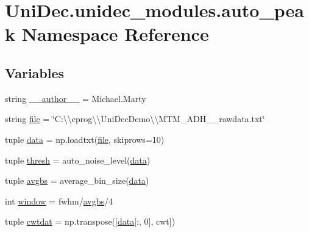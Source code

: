 \hypertarget{namespace_uni_dec_1_1unidec__modules_1_1auto__peak}{}\section{Uni\+Dec.\+unidec\+\_\+modules.\+auto\+\_\+peak Namespace Reference}
\label{namespace_uni_dec_1_1unidec__modules_1_1auto__peak}
\subsection*{Variables}
\begin{DoxyCompactItemize}
\item 
string \hyperlink{namespace_uni_dec_1_1unidec__modules_1_1auto__peak_a4ac9c8672c4aae9cb4a8b70086fb8dbf}{\+\_\+\+\_\+author\+\_\+\+\_\+} = \textquotesingle{}Michael.\+Marty\textquotesingle{}
\item 
string \hyperlink{namespace_uni_dec_1_1unidec__modules_1_1auto__peak_aed4928bf8418274fa1155d36675f0b3c}{file} = \char`\"{}C\+:\textbackslash{}\textbackslash{}cprog\textbackslash{}\textbackslash{}\+Uni\+Dec\+Demo\textbackslash{}\textbackslash{}\+M\+T\+M\+\_\+\+A\+D\+H\+\_\+\_\+rawdata.\+txt\char`\"{}
\item 
tuple \hyperlink{namespace_uni_dec_1_1unidec__modules_1_1auto__peak_a31996c2b129f976b613fb06f3ccf43a2}{data} = np.\+loadtxt(\hyperlink{namespace_uni_dec_1_1unidec__modules_1_1auto__peak_aed4928bf8418274fa1155d36675f0b3c}{file}, skiprows=10)
\item 
tuple \hyperlink{namespace_uni_dec_1_1unidec__modules_1_1auto__peak_a3d3935c25cf2fd153cca4973142a6b42}{thresh} = auto\+\_\+noise\+\_\+level(\hyperlink{namespace_uni_dec_1_1unidec__modules_1_1auto__peak_a31996c2b129f976b613fb06f3ccf43a2}{data})
\item 
tuple \hyperlink{namespace_uni_dec_1_1unidec__modules_1_1auto__peak_a27d98cd4621bb435387b8f6063413108}{avgbs} = average\+\_\+bin\+\_\+size(\hyperlink{namespace_uni_dec_1_1unidec__modules_1_1auto__peak_a31996c2b129f976b613fb06f3ccf43a2}{data})
\item 
int \hyperlink{namespace_uni_dec_1_1unidec__modules_1_1auto__peak_ac99568789a44a90c12609fcdfde18bef}{window} = fwhm/\hyperlink{namespace_uni_dec_1_1unidec__modules_1_1auto__peak_a27d98cd4621bb435387b8f6063413108}{avgbs}/4
\item 
tuple \hyperlink{namespace_uni_dec_1_1unidec__modules_1_1auto__peak_ab2f41ee4c2753756fa96017905742239}{cwtdat} = np.\+transpose(\mbox{[}\hyperlink{namespace_uni_dec_1_1unidec__modules_1_1auto__peak_a31996c2b129f976b613fb06f3ccf43a2}{data}\mbox{[}\+:, 0\mbox{]}, cwt\mbox{]})

\end{DoxyCompactItemize}

